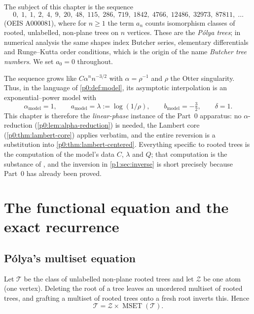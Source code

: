 \documentclass[11pt,a4paper,oneside]{book}
\theoremstyle{plain}
\theoremstyle{definition}
\theoremstyle{remark}
\begin{document}
The subject of this chapter is the sequence
\begin{equation}
 0,\;1,\;1,\;2,\;4,\;9,\;20,\;48,\;115,\;286,\;719,\;1842,\;4766,
 \;12486,\;32973,\;87811,\;\ldots
 \label{p1:eq:sequence}
\end{equation}
(OEIS A000081), where for $n\ge1$ the term $a_n$ counts isomorphism classes of rooted,
unlabelled, non-plane trees on $n$ vertices.  These are the \emph{P\'olya trees}; in numerical
analysis the same shapes index Butcher series, elementary differentials and Runge--Kutta order
conditions, which is the origin of the name \emph{Butcher tree numbers}.  We set $a_0=0$
throughout.

The sequence grows like $C\alpha^nn^{-3/2}$ with $\alpha=\rho^{-1}$ and $\rho$ the Otter
singularity.  Thus, in the language of \cref{p0:def:model}, its asymptotic interpolation is an
exponential--power model with
\begin{equation}
 \boxed{\;\alpha_{\mathrm{model}}=1,\qquad
 a_{\mathrm{model}}=\lambda:=\log(1/\rho),\qquad
 b_{\mathrm{model}}=-\tfrac32,\qquad
 \delta=1.\;}
 \label{p1:eq:dictionary-preview}
\end{equation}
This chapter is therefore the \emph{linear-phase} instance of the Part~0 apparatus: no
$\alpha$-reduction (\cref{p0:lem:alpha-reduction}) is needed, the Lambert core
(\cref{p0:thm:lambert-core}) applies verbatim, and the entire reversion is a substitution into
\cref{p0:thm:lambert-centered}.  Everything specific to rooted trees is the computation of the
model's data $C$, $\lambda$ and $Q$; that computation is the substance of
, and the inversion in \cref{p1:sec:inverse} is short
precisely because Part~0 has already been proved.

\section{The functional equation and the exact recurrence}
\label{p1:sec:polya}

\subsection{P\'olya's multiset equation}

Let $\mathcal T$ be the class of unlabelled non-plane rooted trees and let $\mathcal Z$ be one
atom (one vertex).  Deleting the root of a tree leaves an unordered multiset of rooted trees,
and grafting a multiset of rooted trees onto a fresh root inverts this.  Hence
\begin{equation}
 \mathcal T=\mathcal Z\times\operatorname{MSET}(\mathcal T).
 \label{p1:eq:species}
\end{equation}
\end{document}
